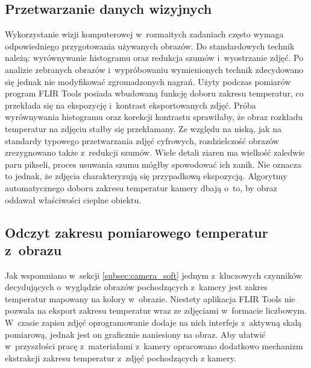 \subsection{Przetwarzanie danych wizyjnych}
Wykorzystanie wizji komputerowej w~rozmaitych zadaniach często wymaga
odpowiedniego przygotowania używanych obrazów.
Do standardowych technik należą: wyrównywanie histogramu oraz redukcja szumów
i~wyostrzanie zdjęć.
Po analizie zebranych obrazów i~wypróbowaniu wymienionych technik zdecydowano
się jednak nie modyfikować zgromadzonych nagrań.
Użyty podczas pomiarów program FLIR Tools posiada wbudowaną funkcję
doboru zakresu temperatur, co przekłada się na ekspozycję i~kontrast
eksportowanych zdjęć.
Próba wyrównywania histogramu oraz korekcji kontrastu sprawiłaby, że obraz
rozkładu temperatur na zdjęciu stałby się przekłamany.
Ze względu na niską, jak na standardy typowego przetwarzania zdjęć cyfrowych,
rozdzielczość obrazów zrezygnowano także z~redukcji szumów.
Wiele detali ziaren ma wielkość zaledwie paru pikseli, proces usuwania szumu
mógłby spowodować ich zanik.
Nie oznacza to jednak, że zdjęcia charakteryzują się przypadkową ekspozycją.
Algorytmy automatycznego doboru zakresu temperatur kamery dbają o~to, by
obraz oddawał właściwości cieplne obiektu.

\subsection{Odczyt zakresu pomiarowego temperatur z~obrazu}
Jak wspomniano w~sekcji \ref{subsec:camera_soft} jednym z~kluczowych czynników
decydujących o~wyglądzie obrazów pochodzących z~kamery jest zakres temperatur
mapowany na kolory w~obrazie.
Niestety aplikacja FLIR Tools nie pozwala na eksport zakresu temperatur wraz
ze zdjęciami w~formacie liczbowym.
W~czasie zapisu zdjęć oprogramowanie dodaje na nich interfejs z~aktywną skalą
pomiarową, jednak jest on graficznie naniesiony na obraz.
Aby ułatwić w~przyszłości pracę z~materiałami z~kamery opracowano dodatkowo
mechanizm ekstrakcji zakresu temperatur z~zdjęć pochodzących z kamery.

